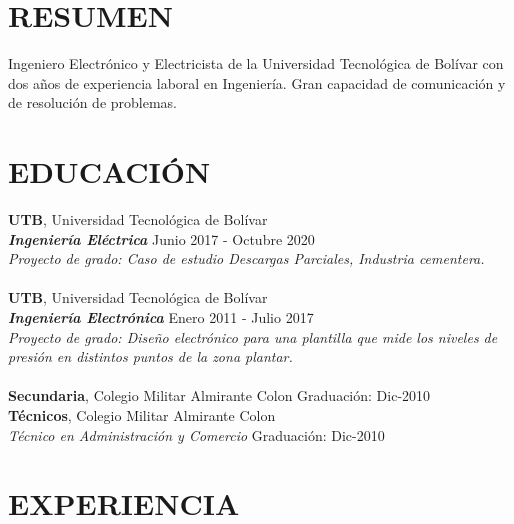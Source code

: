 \documentclass[margin]{res}
\begin{document}
\begin{resume}

\section{RESUMEN}
Ingeniero Electrónico y Electricista de la Universidad Tecnológica de Bolívar con dos años de experiencia laboral en Ingeniería. Gran capacidad de comunicación y de resolución de problemas.

\section{EDUCACIÓN}
\textbf{UTB}, Universidad Tecnológica de Bolívar\\
{\sl \textbf{Ingeniería Eléctrica}} \hfill Junio 2017 - Octubre 2020
\\
{\sl Proyecto de grado: Caso de estudio Descargas Parciales, Industria cementera.}
\\\\
\textbf{UTB}, Universidad Tecnológica de Bolívar\\
{\sl \textbf{Ingeniería Electrónica}} \hfill Enero 2011 - Julio 2017
\\
{\sl Proyecto de grado: Diseño electrónico para una plantilla que mide los niveles de presión en distintos puntos de la zona plantar.}
\\\\
\textbf{Secundaria}, Colegio Militar Almirante Colon \hfill Graduación: Dic-2010
\\
\textbf{Técnicos}, Colegio Militar Almirante Colon\\
{\sl Técnico en Administración y Comercio} \hfill Graduación: Dic-2010


\section{EXPERIENCIA}


\end{resume}
\end{document}
